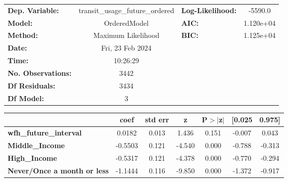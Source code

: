 \documentclass{report}
\begin{document}
\begin{center}
\begin{tabular}{lclc}
\toprule
\textbf{Dep. Variable:}                           & transit\_usage\_future\_ordered & \textbf{  Log-Likelihood:    } &   -5590.0   \\
\textbf{Model:}                                   &           OrderedModel          & \textbf{  AIC:               } & 1.120e+04   \\
\textbf{Method:}                                  &        Maximum Likelihood       & \textbf{  BIC:               } & 1.125e+04   \\
\textbf{Date:}                                    &         Fri, 23 Feb 2024        & \textbf{                     } &             \\
\textbf{Time:}                                    &             10:26:29            & \textbf{                     } &             \\
\textbf{No. Observations:}                        &                3442             & \textbf{                     } &             \\
\textbf{Df Residuals:}                            &                3434             & \textbf{                     } &             \\
\textbf{Df Model:}                                &                   3             & \textbf{                     } &             \\
\bottomrule
\end{tabular}
\begin{tabular}{lcccccc}
                                                  & \textbf{coef} & \textbf{std err} & \textbf{z} & \textbf{P$> |$z$|$} & \textbf{[0.025} & \textbf{0.975]}  \\
\midrule
\textbf{wfh\_future\_interval}                    &       0.0182  &        0.013     &     1.436  &         0.151        &       -0.007    &        0.043     \\
\textbf{Middle\_Income}                           &      -0.5503  &        0.121     &    -4.540  &         0.000        &       -0.788    &       -0.313     \\
\textbf{High\_Income}                             &      -0.5317  &        0.121     &    -4.378  &         0.000        &       -0.770    &       -0.294     \\
\textbf{Never/Once a month or less}               &      -1.1444  &        0.116     &    -9.850  &         0.000        &       -1.372    &       -0.917     \\

\end{tabular}
\end{center}
\end{document}

